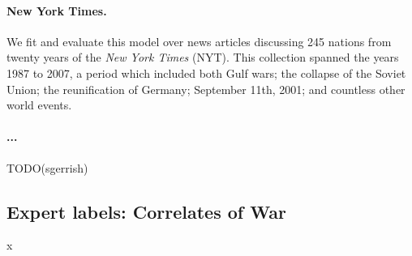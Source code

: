 \paragraph{New York Times.} We fit and evaluate this model over news articles discussing 245
nations from twenty years of the \emph{New York Times} (NYT).  This
collection spanned the years 1987 to 2007, a period which included
both Gulf wars; the collapse of the Soviet Union; the reunification of
Germany; September 11th, 2001; and countless other world events.

\paragraph{...}
TODO(sgerrish)

  
\subsection{Expert labels: Correlates of War}x

